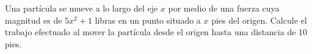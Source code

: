 \item Una partícula se mueve a lo largo del eje $x$ por medio de una fuerza cuya magnitud es de $5x^2 + 1$ libras en un punto situado a $x$ pies del origen. Calcule el trabajo efectuado al mover la partícula desde el origen hasta una distancia de 10 pies.
